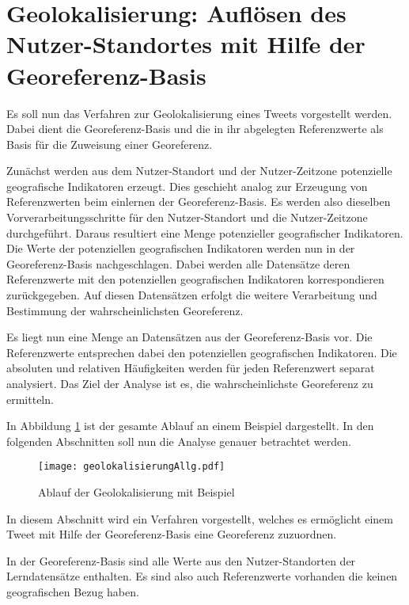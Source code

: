 	\section{Geolokalisierung: Auflösen des Nutzer-Standortes mit Hilfe der Georeferenz-Basis} \label{sec:AufloesenDesNutzerStandortes} 

		Es soll nun das Verfahren zur Geolokalisierung eines Tweets vorgestellt werden.
		Dabei dient die Georeferenz-Basis und die in ihr abgelegten Referenzwerte als Basis für die Zuweisung einer Georeferenz.

		Zunächst werden aus dem Nutzer-Standort und der Nutzer-Zeitzone potenzielle geografische Indikatoren erzeugt.
		Dies geschieht analog zur Erzeugung von Referenzwerten beim einlernen der Georeferenz-Basis.
		Es werden also dieselben Vorverarbeitungsschritte für den Nutzer-Standort und die Nutzer-Zeitzone durchgeführt.
		Daraus resultiert eine Menge potenzieller geografischer Indikatoren.
		Die Werte der potenziellen geografischen Indikatoren werden nun in der Georeferenz-Basis nachgeschlagen. 
		Dabei werden alle Datensätze deren Referenzwerte mit den potenziellen geografischen Indikatoren korrespondieren zurückgegeben.
		Auf diesen Datensätzen erfolgt die weitere Verarbeitung und Bestimmung der wahrscheinlichsten Georeferenz.
		
		Es liegt nun eine Menge an Datensätzen aus der Georeferenz-Basis vor.
		Die Referenzwerte entsprechen dabei den potenziellen geografischen Indikatoren.
		Die absoluten und relativen Häufigkeiten werden für jeden Referenzwert separat analysiert.
		Das Ziel der Analyse ist es, die wahrscheinlichste Georeferenz zu ermitteln.

		In Abbildung \ref{img:ablaufGeolok} ist der gesamte Ablauf an einem Beispiel dargestellt.
		In den folgenden Abschnitten soll nun die Analyse genauer betrachtet werden.

			\begin{figure} 
			\begin{center}
						\texttt{[image: geolokalisierungAllg.pdf]}
						\caption{Ablauf der Geolokalisierung mit Beispiel}
						\label{img:ablaufGeolok}
					\end{center}
			\end{figure}	

		In diesem Abschnitt wird ein Verfahren vorgestellt, welches es ermöglicht einem Tweet mit Hilfe der Georeferenz-Basis eine Georeferenz zuzuordnen. 


		In der Georeferenz-Basis sind alle Werte aus den Nutzer-Standorten der Lerndatensätze enthalten.
		Es sind also auch Referenzwerte vorhanden die keinen geografischen Bezug haben.
		
